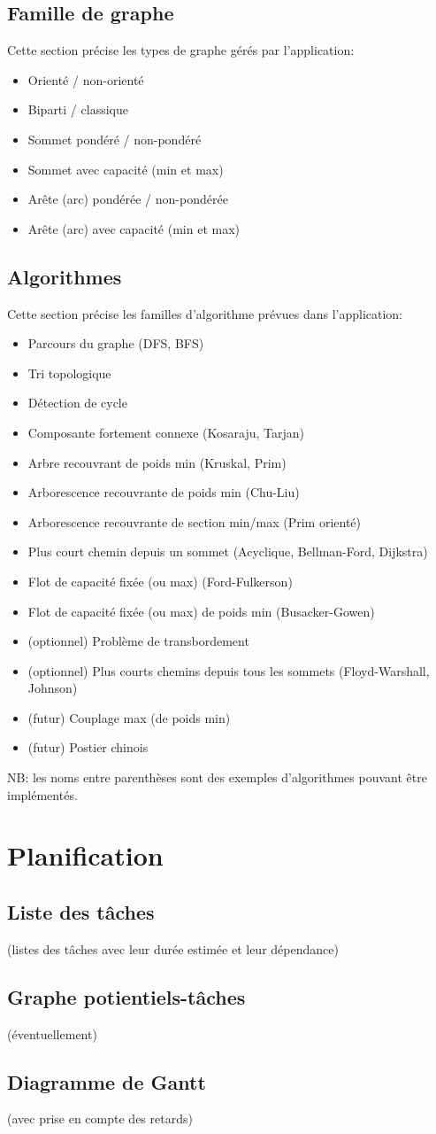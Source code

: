 \documentclass[french]{article}
\begin{document}
		\subsection{Famille de graphe}
			Cette section précise les types de graphe gérés par l'application:
			\begin{itemize}
				\item Orienté / non-orienté
				\item Biparti / classique
				\item Sommet pondéré / non-pondéré
				\item Sommet avec capacité (min et max)
				\item Arête (arc) pondérée / non-pondérée
				\item Arête (arc) avec capacité (min et max)
			\end{itemize}
			
		\subsection{Algorithmes}
			Cette section précise les familles d'algorithme prévues dans l'application:
			\begin{itemize}
				\item Parcours du graphe (DFS, BFS)
				\item Tri topologique
				\item Détection de cycle
				\item Composante fortement connexe (Kosaraju, Tarjan) 
				\item Arbre recouvrant de poids min (Kruskal, Prim)
				\item Arborescence recouvrante de poids min (Chu-Liu)
				\item Arborescence recouvrante de section min/max (Prim orienté)
				\item Plus court chemin depuis un sommet (Acyclique, Bellman-Ford, Dijkstra)
				\item Flot de capacité fixée (ou max) (Ford-Fulkerson)
				\item Flot de capacité fixée (ou max) de poids min (Busacker-Gowen)
				\item (optionnel) Problème de transbordement
				\item (optionnel) Plus courts chemins depuis tous les sommets (Floyd-Warshall, Johnson)
				\item (futur) Couplage max (de poids min)
				\item (futur) Postier chinois
			\end{itemize}
			NB: les noms entre parenthèses sont des exemples d'algorithmes pouvant être implémentés.
		
	\section{Planification}
		\subsection{Liste des tâches}
			(listes des tâches avec leur durée estimée et leur dépendance)
		\subsection{Graphe potientiels-tâches}
			(éventuellement)
		\subsection{Diagramme de Gantt}
			(avec prise en compte des retards)
			
\end{document}
